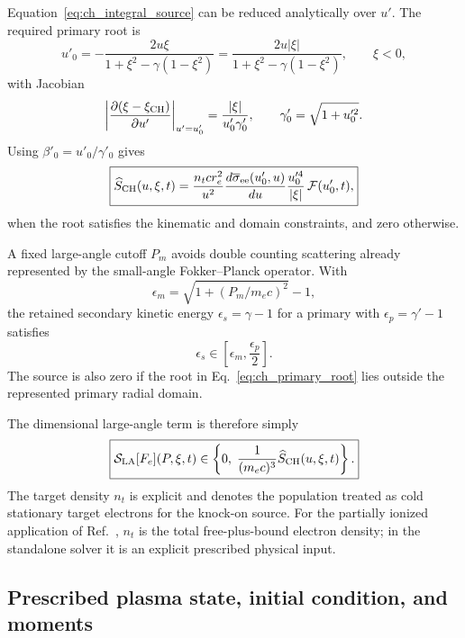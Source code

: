 \documentclass[11pt]{article}
\begin{document}
Equation~\eqref{eq:ch_integral_source} can be reduced analytically over $u'$.  The
required primary root is
\begin{equation}
 u'_0
 =-\frac{2u\xi}{1+\xi^2-\gamma(1-\xi^2)}
 =\frac{2u|\xi|}{1+\xi^2-\gamma(1-\xi^2)},
 \qquad \xi<0,
 \label{eq:ch_primary_root}
\end{equation}
with Jacobian
\begin{equation}
 \left|
 \frac{\partial(\xi-\xi_{\rm CH})}{\partial u'}
 \right|_{u'=u'_0}
 =\frac{|\xi|}{u'_0\gamma'_0},
 \qquad \gamma'_0=\sqrt{1+u_0'^2}.
 \label{eq:ch_delta_jacobian}
\end{equation}
Using $\beta'_0=u'_0/\gamma'_0$ gives
\begin{equation}
 \boxed{
 \widehat S_{\rm CH}(u,\xi,t)
 =\frac{n_t c r_e^2}{u^2}
  \frac{d\overline\sigma_{\rm ee}(u'_0,u)}{du}
  \frac{u_0'^4}{|\xi|}\,
  \mathcal F(u'_0,t),
 }
 \label{eq:ch_reduced_source}
\end{equation}
when the root satisfies the kinematic and domain constraints, and zero otherwise.

A fixed large-angle cutoff $P_m$ avoids double counting scattering already represented
by the small-angle Fokker--Planck operator.  With
\begin{equation}
 \epsilon_m=\sqrt{1+(P_m/m_ec)^2}-1,
\end{equation}
the retained secondary kinetic energy $\epsilon_s=\gamma-1$ for a primary with
$\epsilon_p=\gamma'-1$ satisfies
\begin{equation}
 \epsilon_s\in\left[\epsilon_m,\frac{\epsilon_p}{2}\right].
 \label{eq:ch_energy_range}
\end{equation}
The source is also zero if the root in Eq.~\eqref{eq:ch_primary_root} lies outside the
represented primary radial domain.

The dimensional large-angle term is therefore simply
\begin{equation}
 \boxed{
 \mathcal S_{\rm LA}[F_e](P,\xi,t)
 \in\left\{0,\;\frac{1}{(m_ec)^3}\widehat S_{\rm CH}(u,\xi,t)\right\}.
 }
 \label{eq:large_angle_physical_choices}
\end{equation}
The target density $n_t$ is explicit and denotes the population treated as cold
stationary target electrons for the knock-on source.  For the partially ionized
application of Ref.~, $n_t$ is the total free-plus-bound electron
density; in the standalone solver it is an explicit prescribed physical input.

\subsection{Prescribed plasma state, initial condition, and moments}
\end{document}
